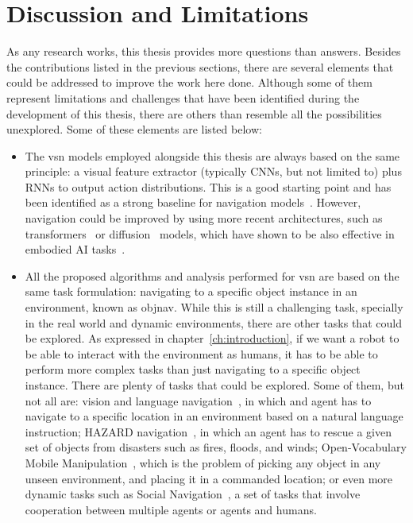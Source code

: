 \section{Discussion and Limitations}\label{sec:discussion-and-limitations}

As any research works, this thesis provides more questions than answers.
Besides the contributions listed in the previous sections, there are several elements that could be addressed to improve the work here done.
Although some of them represent limitations and challenges that have been identified during the development of this thesis, there are others than resemble all the possibilities unexplored.
Some of these elements are listed below:
\begin{itemize}
    \item The \acrshort{vsn} models employed alongside this thesis are always based on the same principle: a visual feature extractor (typically CNNs, but not limited to) plus RNNs to output action distributions.
    This is a good starting point and has been identified as a strong baseline for navigation models~\cite{wijmans2020}.
    However, navigation could be improved by using more recent architectures, such as transformers~\cite{Vaswani2017AttentionIA} or diffusion~\cite{pmlr-v37-sohl-dickstein15} models, which have shown to be also effective in embodied AI tasks~\cite{Shah2023ViNTAF, ren2025prior}.
    \item All the proposed algorithms and analysis performed for \acrshort{vsn} are based on the same task formulation: navigating to a specific object instance in an environment, known as \acrshort{objnav}.
    While this is still a challenging task, specially in the real world and dynamic environments, there are other tasks that could be explored.
    As expressed in chapter~\ref{ch:introduction}, if we want a robot to be able to interact with the environment as humans, it has to be able to perform more complex tasks than just navigating to a specific object instance.
    There are plenty of tasks that could be explored.
    Some of them, but not all are: vision and language navigation~\cite{Anderson2017VisionandLanguageNI}, in which and agent has to navigate to a specific location in an environment based on a natural language instruction; HAZARD navigation~\cite{Zhou2024HAZARDCE}, in which an agent has to rescue a given set of objects from disasters such as fires, floods, and winds; Open-Vocabulary Mobile Manipulation~\cite{homerobotovmm, homerobotovmmchallenge2023}, which is the problem of picking any object in any unseen environment, and placing it in a commanded location; or even more dynamic tasks such as Social Navigation~\cite{puig2024habitat}, a set of tasks that involve cooperation between multiple agents or agents and humans.

\end{itemize}
